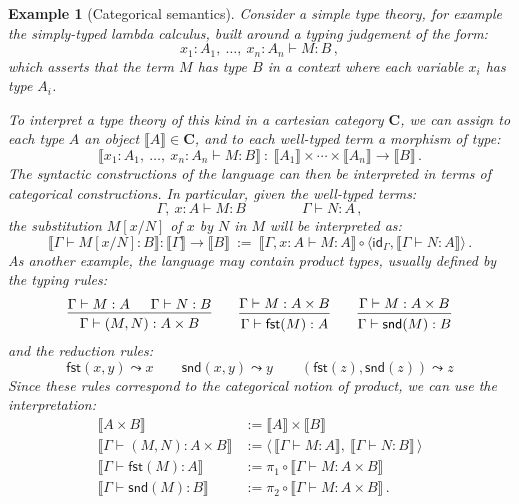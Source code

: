 \documentclass[11pt,oneside,draft]{book}
\newtheorem{example}[theorem]{Example}
\theoremstyle{definition}
\newcommand{\kw}[1]{\ensuremath{ \mathsf{#1} }}
\begin{document}
\begin{example}[Categorical semantics] \label{ex:ttcc} %
Consider a simple type theory,
for example the simply-typed lambda calculus,
built around a typing judgement of the form:
\[
  x_1 : A_1, \: \ldots, \: x_n : A_n \vdash M : B
  \,,
\]
which asserts that the term $M$ has type $B$
in a context where each variable $x_i$
has type $A_i$.

To interpret a type theory of this kind in
a cartesian category $\mathbf{C}$,
we can assign to each type $A$
an object $\llbracket A \rrbracket \in \mathbf{C}$,
and to each well-typed term a morphism of type:
\[
  \llbracket x_1 : A_1, \: \ldots, \: x_n : A_n \vdash M : B \rrbracket
  \: : \:
  \llbracket A_1 \rrbracket \times \cdots \times
  \llbracket A_n \rrbracket \rightarrow
  \llbracket B \rrbracket
  \,.
\]
The syntactic constructions of the language
can then be interpreted in terms of
categorical constructions.
In particular,
given the well-typed terms:
\[
  \Gamma, \: x : A \vdash M : B
  \qquad \qquad
  \Gamma \vdash N : A
  \,,
\]
the substitution $M[x/N]$ of $x$ by $N$ in $M$
will be interpreted as:
\[
  \llbracket \Gamma \vdash M[x/N] : B \rrbracket
  :
  \llbracket \Gamma \rrbracket \rightarrow \llbracket B \rrbracket
  \: := \:
  \llbracket \Gamma, x:A \vdash M : A \rrbracket \circ
  \langle
    \kw{id}_\Gamma,
    \llbracket \Gamma \vdash N : A \rrbracket
  \rangle
  \,.
\]
As another example,
the language may contain product types,
usually defined by the typing rules:
\[
  \begin{prooftree}
    \hypo{\Gamma \vdash M : A}
    \hypo{\Gamma \vdash N : B}
    \infer2{\Gamma \vdash (M, N) : A \times B}
  \end{prooftree}
  \qquad
  \begin{prooftree}
    \hypo{\Gamma \vdash M : A \times B}
    \infer1{\Gamma \vdash \kw{fst}(M) : A}
  \end{prooftree}
  \qquad
  \begin{prooftree}
    \hypo{\Gamma \vdash M : A \times B}
    \infer1{\Gamma \vdash \kw{snd}(M) : B}
  \end{prooftree}
\]
and the reduction rules:
\[
  \kw{fst}(x, y) \leadsto x
  \qquad
  \kw{snd}(x, y) \leadsto y
  \qquad
  (\kw{fst}(z), \kw{snd}(z)) \leadsto z
\]
Since these rules correspond to the categorical notion of product,
we can use the interpretation:
\begin{align*}
  \llbracket A \times B \rrbracket &:=
    \llbracket A \rrbracket \times \llbracket B \rrbracket \\
  \llbracket \Gamma \vdash (M, N) : A \times B \rrbracket &:=
    \langle \,
      \llbracket \Gamma \vdash M : A \rrbracket, \:
      \llbracket \Gamma \vdash N : B \rrbracket \,
    \rangle \\
  \llbracket \Gamma \vdash \kw{fst}(M) : A \rrbracket &:=
    \pi_1 \circ \llbracket \Gamma \vdash M : A \times B \rrbracket \\
  \llbracket \Gamma \vdash \kw{snd}(M) : B \rrbracket &:=
    \pi_2 \circ \llbracket \Gamma \vdash M : A \times B \rrbracket
  \,.
\end{align*}
\end{example}
\end{document}
